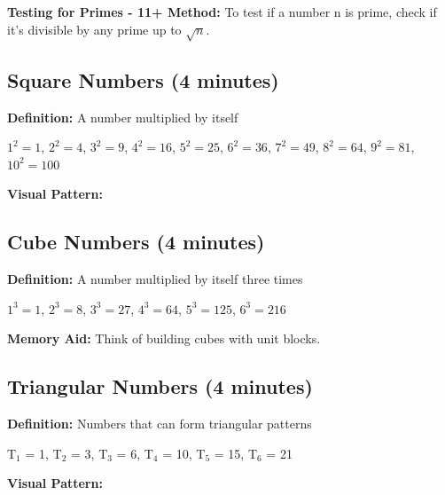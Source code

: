 \documentclass{article}
\begin{document}
\textbf{Testing for Primes - 11+ Method:}
To test if a number n is prime, check if it's divisible by any prime up to $\sqrt{n}$.

\subsection{Square Numbers (4 minutes)}

\textbf{Definition:} A number multiplied by itself
\begin{center}
$1^2 = 1$, $2^2 = 4$, $3^2 = 9$, $4^2 = 16$, $5^2 = 25$, $6^2 = 36$, $7^2 = 49$, $8^2 = 64$, $9^2 = 81$, $10^2 = 100$
\end{center}

\textbf{Visual Pattern:}
\begin{center}
\end{center}

\subsection{Cube Numbers (4 minutes)}

\textbf{Definition:} A number multiplied by itself three times
\begin{center}
$1^3 = 1$, $2^3 = 8$, $3^3 = 27$, $4^3 = 64$, $5^3 = 125$, $6^3 = 216$
\end{center}

\textbf{Memory Aid:} Think of building cubes with unit blocks.

\subsection{Triangular Numbers (4 minutes)}

\textbf{Definition:} Numbers that can form triangular patterns
\begin{center}
T$_1$ = 1, T$_2$ = 3, T$_3$ = 6, T$_4$ = 10, T$_5$ = 15, T$_6$ = 21
\end{center}

\textbf{Visual Pattern:}
\begin{center}
\end{center}
\end{document}
